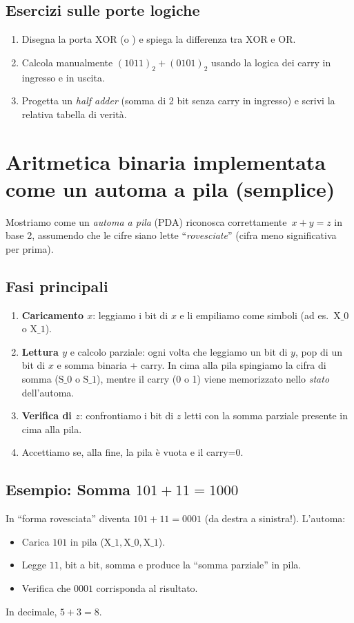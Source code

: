 \documentclass[a4paper,12pt]{report}
\begin{document}
\subsection*{Esercizi sulle porte logiche}
\begin{enumerate}
    \item Disegna la porta \(\text{XOR}\) (o ) e spiega la differenza tra \(\text{XOR}\) e \(\text{OR}\).
    \item Calcola manualmente \((1011)_2 + (0101)_2\) usando la logica dei carry in ingresso e in uscita.
    \item Progetta un \emph{half adder} (somma di 2 bit senza carry in ingresso) e scrivi la relativa tabella di verità.
\end{enumerate}


\section{Aritmetica binaria implementata come un automa a pila (semplice)}\label{sec:automa_bin}
Mostriamo come un \emph{automa a pila} (PDA) riconosca correttamente \(\,x + y = z\) in base 2, assumendo che le cifre siano lette “\emph{rovesciate}” (cifra meno significativa per prima).

\subsection*{Fasi principali}
\begin{enumerate}
    \item \textbf{Caricamento \(x\)}: leggiamo i bit di \(x\) e li empiliamo come simboli (ad es.\ \(\mathrm{X\_0}\) o \(\mathrm{X\_1}\)).
    \item \textbf{Lettura \(y\)} e calcolo parziale: ogni volta che leggiamo un bit di \(y\), pop di un bit di \(x\) e somma binaria + carry. In cima alla pila spingiamo la cifra di somma (\(\mathrm{S\_0}\) o \(\mathrm{S\_1}\)), mentre il carry (0 o 1) viene memorizzato nello \emph{stato} dell’automa.
    \item \textbf{Verifica di \(z\)}: confrontiamo i bit di \(z\) letti con la somma parziale presente in cima alla pila.
    \item Accettiamo se, alla fine, la pila è vuota e il carry=0.
\end{enumerate}

\subsection*{Esempio: Somma \(101 + 11 = 1000\)}
In “forma rovesciata” diventa \(101 + 11 = 0001\) (da destra a sinistra!). L’automa:
\begin{itemize}
    \item Carica \(101\) in pila (\(\mathrm{X\_1}, \mathrm{X\_0}, \mathrm{X\_1}\)).
    \item Legge \(11\), bit a bit, somma e produce la “somma parziale” in pila.
    \item Verifica che \(0001\) corrisponda al risultato.  
\end{itemize}
In decimale, \(5 + 3 = 8\).
\end{document}
